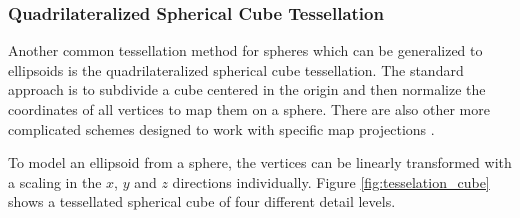 \subsubsection{Quadrilateralized Spherical Cube Tessellation}
 
Another common tessellation method for spheres which can be generalized to ellipsoids is the quadrilateralized spherical cube tessellation. The standard approach is to subdivide a cube centered in the origin and then normalize the coordinates of all vertices to map them on a sphere. There are also other more complicated schemes designed to work with specific map projections \cite{dimi15}.

To model an ellipsoid from a sphere, the vertices can be linearly transformed with a scaling in the $x$, $y$ and $z$ directions individually. Figure \ref{fig:tesselation_cube} shows a tessellated spherical cube of four different detail levels.

